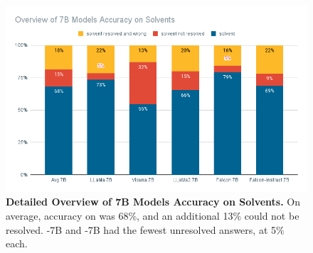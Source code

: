 \begin{figure}[!htbp]
    \begin{centering}
        \includegraphics[width=\textwidth]{img/overview_7b_solv}
        \caption[7B Models Detailed Solvent Accuracy]{\textbf{Detailed Overview of 7B Models Accuracy on Solvents.}
            On average, accuracy on \tsolv was 68\%, and an additional 13\% could not be resolved.
            -7B and -7B had the fewest unresolved answers, at 5\% each.
        }
        \label{fig:7b_solv}
    \end{centering}
\end{figure}
